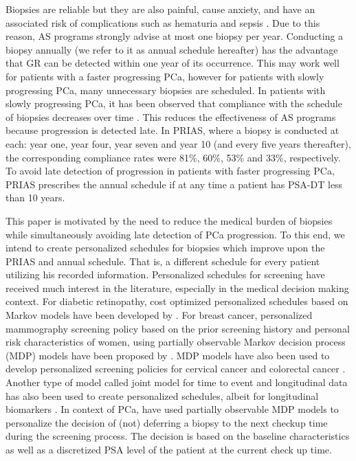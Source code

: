 Biopsies are reliable but they are also painful, cause anxiety, and have an associated risk of complications such as hematuria and sepsis \citep{loeb2013systematic}. Due to this reason, AS programs strongly advise at most one biopsy per year. Conducting a biopsy annually (we refer to it as annual schedule hereafter) has the advantage that GR can be detected within one year of its occurrence. This may work well for patients with a faster progressing PCa, however for patients with slowly progressing PCa, many unnecessary biopsies are scheduled. In patients with slowly progressing PCa, it has been observed that compliance with the schedule of biopsies decreases over time \citep{bokhorst2015compliance}. This reduces the effectiveness of AS programs because progression is detected late. In PRIAS, where a biopsy is conducted at each: year one, year four, year seven and year 10 (and every five years thereafter), the corresponding compliance rates were 81\%, 60\%, 53\% and 33\%, respectively. To avoid late detection of progression in patients with faster progressing PCa, PRIAS prescribes the annual schedule if at any time a patient has PSA-DT less than 10 years. 

This paper is motivated by the need to reduce the medical burden of biopsies while simultaneously avoiding late detection of PCa progression. To this end, we intend to create personalized schedules for biopsies which improve upon the PRIAS and annual schedule. That is, a different schedule for every patient utilizing his recorded information. Personalized schedules for screening have received much interest in the literature, especially in the medical decision making context. For diabetic retinopathy, cost optimized personalized schedules based on Markov models have been developed by \citet{bebu2017OptimalScreening}. For breast cancer, personalized mammography screening policy based on the prior screening history and personal risk characteristics of women, using partially observable Markov decision process (MDP) models have been proposed by \citet*{ayer2012or}. MDP models have also been used to develop personalized screening policies for cervical cancer \citep*{akhavan2017markov} and colorectal cancer \citep*{erenay2014optimizing}. Another type of model called joint model for time to event and longitudinal data \citep{tsiatis2004joint,rizopoulos2012joint} has also been used to create personalized schedules, albeit for longitudinal biomarkers \citep{drizopoulosPersScreening}. In context of PCa, \citet{zhang2012optimization} have used partially observable MDP models to personalize the decision of (not) deferring a biopsy to the next checkup time during the screening process. The decision is based on the baseline characteristics as well as a discretized PSA level of the patient at the current check up time.


